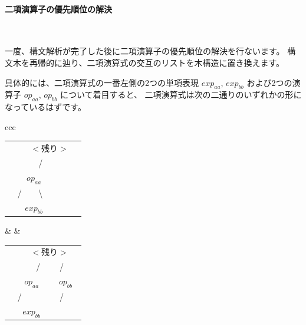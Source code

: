 \documentclass[mingoth,a4paper]{jsarticle}
\begin{document}






\paragraph{二項演算子の優先順位の解決} \ 

一度、構文解析が完了した後に二項演算子の優先順位の解決を行ないます。
構文木を再帰的に辿り、二項演算式の交互のリストを木構造に置き換えます。

具体的には、二項演算式の一番左側の2つの単項表現 $exp_{aa}$, $exp_{bb}$ および2つの演算子 $op_{aa}$, $op_{bb}$ について着目すると、
二項演算式は次の二通りのいずれかの形になっているはずです。

\begin{tabular}{ccc}

\begin{tabular}{ccccc}
\rowcolor{white} &              &\multicolumn{2}{c}{$<残り>$}  &                       \\
\rowcolor{white} &              &       /      &                &                       \\
\rowcolor{white} &\multicolumn{2}{c}{$op_{aa}$}&                &                       \\
\rowcolor{white} &    /       & \textbackslash &                &                       \\
\rowcolor{white} \multicolumn{2}{c}{$exp_{aa}$}& \multicolumn{2}{c}{$exp_{bb}$}&        \\
\end{tabular} 
& &
\begin{tabular}{ccccc}
\rowcolor{white}              &                &\multicolumn{2}{c}{$<残り>$} \\
\rowcolor{white}              &                &     /       &        /     &             \\
\rowcolor{white}              & \multicolumn{2}{c}{$op_{aa}$} &\multicolumn{2}{c}{$op_{bb}$} \\
\rowcolor{white}              &       /       &              &        /     &            \\
\rowcolor{white} \multicolumn{2}{c}{$exp_{aa}$} & \multicolumn{2}{c}{$exp_{bb}$}&             \\
\end{tabular}
\\
\end{tabular}
\label{fig:op2tree}
\end{document}
